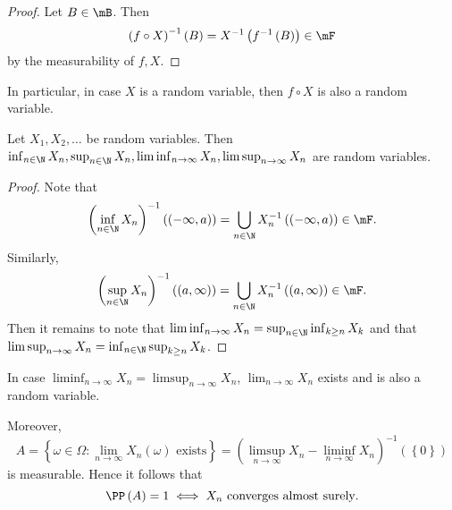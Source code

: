 \documentclass[stat901]{subfiles}
\begin{document}
    \begin{proof}
        Let $B\in\mB$. Then
        \begin{equation*}
            \left( f\circ X \right)^{-1}\left( B \right) = X^{-1}\left( f^{-1}\left( B \right) \right) \in \mF
        \end{equation*}
        by the measurability of $f,X$.
    \end{proof}

    \np In particular, in case $X$ is a random variable, then $f\circ X$ is also a random variable.

    \begin{theorem}{}
        Let $X_1,X_2,\ldots$ be random variables. Then $\inf_{n\in\N}X_n,\sup_{n\in\N}X_n,\liminf_{n\to\infty}X_n,\limsup_{n\to\infty}X_n$ are random variables.
    \end{theorem}

    \begin{proof}
        Note that 
        \begin{equation*}
            \left( \inf_{n\in\N}X_n \right)^{-1}\left( \left( -\infty,a \right) \right) = \bigcup^{}_{n\in\N} X_n^{-1}\left( \left( -\infty,a \right) \right)\in\mF.
        \end{equation*}
        Similarly,
        \begin{equation*}
            \left( \sup_{n\in\N}X_n \right)^{-1}\left( \left( a,\infty \right) \right) = \bigcup^{}_{n\in\N} X_n^{-1}\left( \left( a,\infty \right) \right)\in\mF.
        \end{equation*}
        Then it remains to note that $\liminf_{n\to\infty}X_n = \sup_{n\in\N}\inf_{k\geq n}X_k$ and that $\limsup_{n\to\infty}X_n = \inf_{n\in\N}\sup_{k\geq n}X_k$.
    \end{proof}

    \np In case $\liminf_{n\to\infty}X_n = \limsup_{n\to\infty}X_n$, $\lim_{n\to\infty}X_n$ exists and is also a random variable.

    Moreover,
    \begin{equation*}
        A = \left\lbrace \omega\in\Omega: \lim_{n\to\infty}X_n\left( \omega \right)\text{ exists} \right\rbrace = \left( \limsup_{n\to\infty}X_n-\liminf_{n\to\infty}X_n \right)^{-1}\left( \left\lbrace 0 \right\rbrace \right)
    \end{equation*}
    is measurable. Hence it follows that
    \begin{equation*}
        \PP\left( A \right) = 1 \iff X_n\text{ converges almost surely}.
    \end{equation*}


























    
    
    
    
\end{document}

